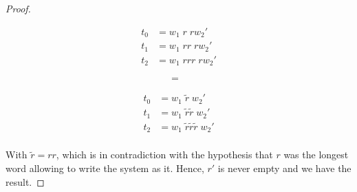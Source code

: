 \begin{proof}
    \setlength{\columnsep}{-7.5cm}
    \begin{multicols}{3}
        \noindent
        \begin{align*}
            t_0 & = w_1\; r\;  r w_2'     \\
            t_1 & = w_1\; rr\;  r w_2'    \\
            t_2 & = w_1\; r r r\;  r w_2' \\
        \end{align*}
        \begin{align*}
             & \\
            =  \\
             & \\
             &
        \end{align*}
        \begin{align*}
            t_0 & = w_1\; \tilde{r}\;  w_2'                  \\
            t_1 & = w_1\; \tilde{r}\tilde{r}\;w_2'           \\
            t_2 & = w_1\; \tilde{r}\tilde{r}\tilde{r}\; w_2' \\
        \end{align*}
    \end{multicols}

    With $\tilde{r} = rr$, which is in contradiction with the hypothesis that $r$ was the longest word allowing to write the system as it. Hence, $r'$ is never empty and we have the result.



\end{proof}


